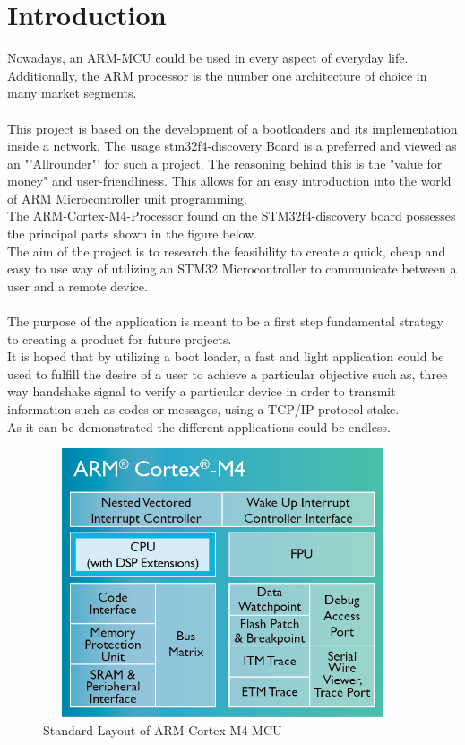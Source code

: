 \chapter{Introduction}

\glsaddall

Nowadays, an ARM-MCU could be used in every aspect of everyday life.
Additionally, the ARM processor is the number one architecture of choice in 
many market segments.\\\\ 
This project is based on the development of a bootloaders and its implementation 
inside a network. The usage stm32f4-discovery Board is a preferred and viewed as an 
"'Allrounder"' for such a project. The reasoning behind this is the "value for money" 
and user-friendliness. This allows for an easy introduction into the world of ARM
Microcontroller unit programming.\citep{ST-15}\\
The ARM-Cortex-M4-Processor found on the STM32f4-discovery board possesses  
the principal parts shown in the figure below.\\
The aim of the project is to research the feasibility to create a quick, cheap 
and easy to use way of utilizing an STM32 Microcontroller to communicate between 
a user and a remote device.\citep{ARM-14}\\\\
The purpose of the application is meant to be a first step fundamental strategy to 
creating a product for future projects.\\
It is hoped that by utilizing a boot loader, a fast and light application could 
be used to fulfill the desire of a user to achieve a particular objective such 
as, three way handshake signal to verify a particular device in order to transmit 
information such as codes or messages, using a TCP/IP protocol stake.\\
As it can be demonstrated the different applications could be endless.\\ 

\begin{figure}[ht]
	\centering
	\includegraphics[width=400px, height=300px]{../img/Cortex-M4-chip-diagram-LG.png}
	\caption{Standard Layout of ARM Cortex-M4 MCU}
	\label{m4_prinzip}
\end{figure}

